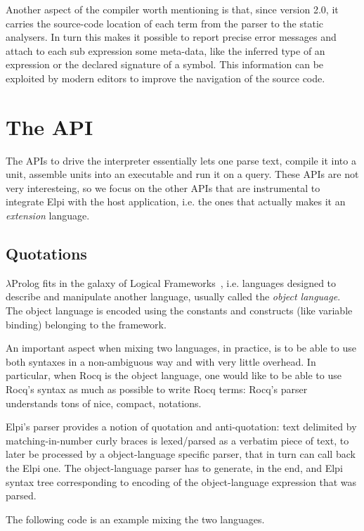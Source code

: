 \documentclass[a4paper, 11pt]{book}
\begin{document}
Another aspect of the compiler worth mentioning is that, since version 2.0,
it carries the source-code location of each term from the parser to the
static analysers. In turn this makes it possible to report precise error
messages and attach to each sub expression some meta-data, like the inferred type of
an expression or the declared signature of a symbol. This information
can be exploited by modern editors to improve the navigation of the source code.

\section{The API}\label{sec:API}

The APIs to drive the interpreter essentially lets one parse text,
compile it into a unit, assemble units into an executable and run it on a query.
These APIs are not very interesteing, so we focus on the other APIs that are
instrumental to integrate Elpi with the host application, i.e. the ones that
actually makes it an \emph{extension} language.

\subsection{Quotations}

$\lambda$Prolog fits in the galaxy of Logical Frameworks~\cite{HarperHP87},
i.e. languages designed to describe and manipulate another language,
usually called the \emph{object language}. The object language is encoded
using the constants and constructs (like variable binding) belonging to the
framework.

An important aspect when mixing two languages, in practice, is to be able to use
both syntaxes in a non-ambiguous way and with very little overhead.
In particular, when Rocq is the object language, one would like to be able
to use Rocq's syntax as much as possible to write Rocq terms: Rocq's
parser understands tons of nice, compact, notations.

Elpi's parser provides a notion of quotation and anti-quotation:
text delimited by matching-in-number curly braces is
lexed/parsed as a verbatim piece of text, to later be processed by
a object-language specific parser, that in turn can call back the Elpi one.
The object-language parser has to generate, in the end, and Elpi syntax tree
corresponding to encoding of the object-language expression that was parsed.

The following code is an example mixing the two languages.
\end{document}
